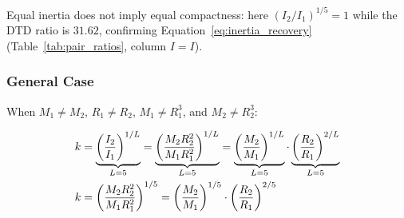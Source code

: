 \documentclass[twoside,twocolumn,9pt]{article}
\begin{document}
\noindent Equal inertia does not imply equal compactness: here $(I_2/I_1)^{1/5} = 1$ while the DTD ratio is $31.62$, confirming Equation~\ref{eq:inertia_recovery} (Table~\ref{tab:pair_ratios}, column $I = I$).

\subsubsection*{General Case}

When $M_1 \neq M_2$, $R_1 \neq R_2$, $M_1 \neq R_1^3$, and $M_2 \neq R_2^3$:

\begin{align}
k &= \underbrace{\left(\frac{I_2}{I_1}\right)^{1/L}}_{L=5} = \underbrace{\left(\frac{M_2 R_2^2}{M_1 R_1^2}\right)^{1/L}}_{L=5} = \underbrace{\left(\frac{M_2}{M_1}\right)^{1/L}}_{L=5} \cdot \underbrace{\left(\frac{R_2}{R_1}\right)^{2/L}}_{L=5} \notag \\
k &= \left(\frac{M_2 R_2^2}{M_1 R_1^2}\right)^{1/5} = \left(\frac{M_2}{M_1}\right)^{1/5} \cdot \left(\frac{R_2}{R_1}\right)^{2/5}
\end{align}
\end{document}
